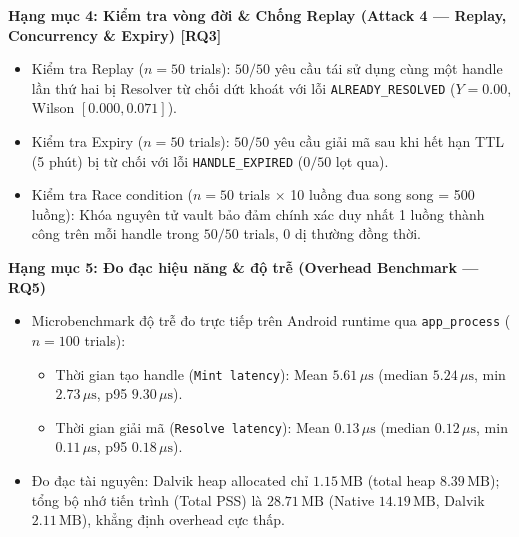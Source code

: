 \documentclass[11pt,a4paper]{article}
\newcommand{\done}{\textcolor{shgreen}{$\blacksquare$}}
\newcommand{\code}[1]{\texttt{\small #1}}
\begin{document}
\begin{chk}
\item[\done] \textbf{Hạng mục 4: Kiểm tra vòng đời \& Chống Replay (Attack 4 --- Replay, Concurrency \& Expiry) [RQ3]}
  \begin{itemize}
    \item[\done] Kiểm tra Replay ($n=50$ trials): $50/50$ yêu cầu tái sử dụng cùng một handle lần thứ hai bị Resolver từ chối dứt khoát với lỗi \code{ALREADY\_RESOLVED} ($Y = 0.00$, Wilson $[0.000, 0.071]$).
    \item[\done] Kiểm tra Expiry ($n=50$ trials): $50/50$ yêu cầu giải mã sau khi hết hạn TTL (5 phút) bị từ chối với lỗi \code{HANDLE\_EXPIRED} ($0/50$ lọt qua).
    \item[\done] Kiểm tra Race condition ($n=50$ trials $\times$ 10 luồng đua song song = 500 luồng): Khóa nguyên tử vault bảo đảm chính xác duy nhất 1 luồng thành công trên mỗi handle trong $50/50$ trials, $0$ dị thường đồng thời.
  \end{itemize}

\item[\done] \textbf{Hạng mục 5: Đo đạc hiệu năng \& độ trễ (Overhead Benchmark --- RQ5)}
  \begin{itemize}
    \item[\done] Microbenchmark độ trễ đo trực tiếp trên Android runtime qua \code{app\_process} ($n=100$ trials):
      \begin{itemize}
        \item Thời gian tạo handle (\code{Mint latency}): Mean $5.61\,\mu\text{s}$ (median $5.24\,\mu\text{s}$, min $2.73\,\mu\text{s}$, p95 $9.30\,\mu\text{s}$).
        \item Thời gian giải mã (\code{Resolve latency}): Mean $0.13\,\mu\text{s}$ (median $0.12\,\mu\text{s}$, min $0.11\,\mu\text{s}$, p95 $0.18\,\mu\text{s}$).
      \end{itemize}
    \item[\done] Đo đạc tài nguyên: Dalvik heap allocated chỉ $1.15\,\text{MB}$ (total heap $8.39\,\text{MB}$); tổng bộ nhớ tiến trình (Total PSS) là $28.71\,\text{MB}$ (Native $14.19\,\text{MB}$, Dalvik $2.11\,\text{MB}$), khẳng định overhead cực thấp.
  \end{itemize}


\end{chk}
\end{document}
